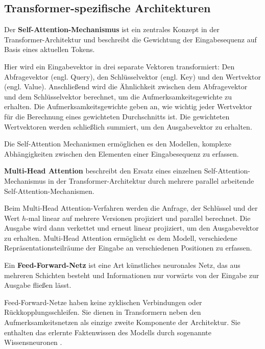 \subsection{Transformer-spezifische Architekturen}

\begin{definition}\label{def:self-attention-mechanismus}
    Der \textbf{Self-Attention-Mechanismus} ist ein zentrales Konzept in der Transformer-Architektur und beschreibt die Gewichtung der Eingabesequenz auf Basis eines aktuellen Tokens.
\end{definition}
Hier wird ein Eingabevektor in drei separate Vektoren transformiert:
Den Abfragevektor (engl. Query), den Schlüsselvektor (engl. Key) und den Wertvektor (engl. Value).
Anschließend wird die Ähnlichkeit zwischen dem Abfragevektor und dem Schlüsselvektor berechnet,
um die Aufmerksamkeitsgewichte zu erhalten.
Die Aufmerksamkeitsgewichte geben an, wie wichtig jeder Wertvektor für die Berechnung eines gewichteten
Durchschnitts ist. Die gewichteten Wertvektoren werden schließlich summiert, um den Ausgabevektor zu erhalten.

Die Self-Attention Mechanismen ermöglichen es den Modellen, komplexe Abhängigkeiten zwischen den Elementen einer Eingabesequenz zu erfassen.\\

\begin{definition}\label{def:multi-head-attention}
    \textbf{Multi-Head Attention} beschreibt den Ersatz eines einzelnen Self-Attention-Mechanismus in der Transformer-Architektur durch mehrere parallel arbeitende Self-Attention-Mechanismen.
\end{definition}
Beim Multi-Head Attention-Verfahren werden die Anfrage, der Schlüssel und der Wert $h$-mal linear auf mehrere Versionen projiziert und parallel berechnet. Die Ausgabe wird dann verkettet und erneut linear projiziert, um den Ausgabevektor zu erhalten. Multi-Head Attention ermöglicht es dem Modell, verschiedene Repräsentationsteilräume der Eingabe an verschiedenen Positionen zu erfassen.

\begin{definition}\label{def:feed-forward-netz}
    Ein \textbf{Feed-Forward-Netz} ist eine Art künstliches neuronales Netz, das aus mehreren Schichten besteht und Informationen nur vorwärts von der Eingabe zur Ausgabe fließen lässt.
\end{definition}
Feed-Forward-Netze haben keine zyklischen Verbindungen oder Rückkopplungsschleifen.
Sie dienen in Transformern neben den Aufmerksamkeitsnetzen als einzige zweite Komponente der Architektur.
Sie enthalten das erlernte Faktenwissen des Modells durch sogenannte Wissensneuronen \citep{knowledge_neurons}.\\

